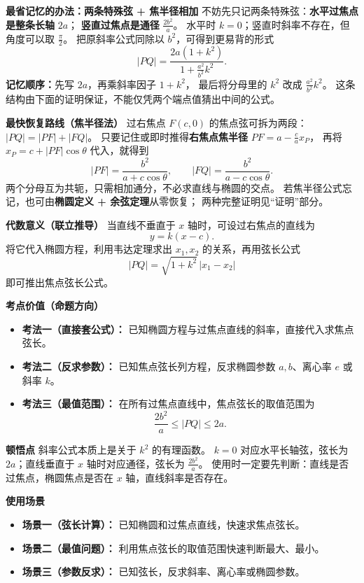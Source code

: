 \begin{explanationbox}
	
    \textbf{\textcolor{CExplanation}{最省记忆的办法：两条特殊弦 + 焦半径相加}}
    不妨先只记两条特殊弦：\textbf{水平过焦点是整条长轴} $2a$；
    \textbf{竖直过焦点是通径} $\frac{2b^2}{a}$。
    水平时 $k=0$；竖直时斜率不存在，但角度可以取 $\frac{\pi}{2}$。
    把原斜率公式同除以 $b^2$，可得到更易背的形式
    \[
        \boxed{|PQ|=\frac{2a(1+k^2)}{1+\frac{a^2}{b^2}k^2}}.
    \]
    \textbf{记忆顺序：}先写 $2a$，再乘斜率因子 $1+k^2$，
    最后将分母里的 $k^2$ 改成 $\frac{a^2}{b^2}k^2$。
    这条结构由下面的证明保证，不能仅凭两个端点值猜出中间的公式。

    \medskip

    \textbf{\textcolor{CExplanation}{最快恢复路线（焦半径法）}}
    过右焦点 $F(c,0)$ 的焦点弦可拆为两段：$|PQ|=|PF|+|FQ|$。
    只要记住或即时推得\textbf{右焦点焦半径} $PF=a-\frac ca x_P$，
    再将 $x_P=c+|PF|\cos\theta$ 代入，就得到
    \[
        |PF|=\frac{b^2}{a+c\cos\theta},\qquad
        |FQ|=\frac{b^2}{a-c\cos\theta}.
    \]
    两个分母互为共轭，只需相加通分，不必求直线与椭圆的交点。
    若焦半径公式忘记，也可由\textbf{椭圆定义 + 余弦定理}从零恢复；
    两种完整证明见“证明”部分。

    \medskip


\textbf{\textcolor{CExplanation}{代数意义（联立推导）}}
	当直线不垂直于 $x$ 轴时，可设过右焦点的直线为
	\[
		y=k(x-c).
	\]
	将它代入椭圆方程，利用韦达定理求出 $x_1,x_2$ 的关系，再用弦长公式
	\[
		|PQ|=\sqrt{1+k^2}\,|x_1-x_2|
	\]
	即可推出焦点弦长公式。

	\medskip

	\textbf{\textcolor{CExplanation}{考点价值（命题方向）}}

	\begin{itemize}[leftmargin=*, itemsep=0.5em, topsep=0.4em]
		\item \textbf{考法一（直接套公式）：} 已知椭圆方程与过焦点直线的斜率，直接代入求焦点弦长。
		\item \textbf{考法二（反求参数）：} 已知焦点弦长列方程，反求椭圆参数 $a,b$、离心率 $e$ 或斜率 $k$。
		\item \textbf{考法三（最值范围）：} 在所有过焦点直线中，焦点弦长的取值范围为
		      \[
			      \frac{2b^2}{a}\le |PQ|\le 2a.
		      \]
	\end{itemize}

	\medskip

	\textbf{\textcolor{CExplanation}{顿悟点}}
	斜率公式本质上是关于 $k^2$ 的有理函数。
	$k=0$ 对应水平长轴弦，弦长为 $2a$；直线垂直于 $x$ 轴时对应通径，弦长为 $\frac{2b^2}{a}$。
	使用时一定要先判断：直线是否过焦点，椭圆焦点是否在 $x$ 轴，直线斜率是否存在。

	\medskip

	\textbf{\textcolor{CExplanation}{使用场景}}

	\begin{itemize}[leftmargin=*, itemsep=0.5em, topsep=0.4em]
		\item \textbf{场景一（弦长计算）：} 已知椭圆和过焦点直线，快速求焦点弦长。
		\item \textbf{场景二（最值问题）：} 利用焦点弦长的取值范围快速判断最大、最小。
		\item \textbf{场景三（参数反求）：} 已知弦长，反求斜率、离心率或椭圆参数。
	\end{itemize}
\end{explanationbox}